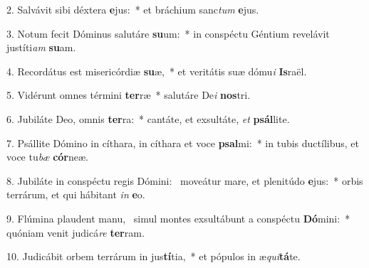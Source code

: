 2. Salvávit sibi déxtera \textbf{e}jus:~*  et bráchium sanc\textit{tum} \textbf{e}jus.\

3. Notum fecit Dóminus salutáre \textbf{su}um:~*  in conspéctu Géntium revelávit justíti\textit{am} \textbf{su}am.\

4. Recordátus est misericórdiæ \textbf{su}æ,~*  et veritátis suæ dómu\textit{i} \textbf{Is}raël.\

5. Vidérunt omnes términi \textbf{ter}ræ~*  salutáre De\textit{i} \textbf{nos}tri.\

6. Jubiláte Deo, omnis \textbf{ter}ra:~*  cantáte, et exsultáte, \textit{et} \textbf{psál}lite.\

7. Psállite Dómino in cíthara, in cíthara et voce \textbf{psal}mi:~*  in tubis ductílibus, et voce tu\textit{bæ} \textbf{cór}neæ.\

8. Jubiláte in conspéctu regis Dómini: \dag\  moveátur mare, et plenitúdo \textbf{e}jus:~*  orbis terrárum, et qui hábitant \textit{in} \textbf{e}o.\

9. Flúmina plaudent manu, \dag\  simul montes exsultábunt a conspéctu \textbf{Dó}mini:~*  quóniam venit judicá\textit{re} \textbf{ter}ram.\

10. Judicábit orbem terrárum in jus\textbf{tí}tia,~*  et pópulos in æ\textit{qui}\textbf{tá}te.\


